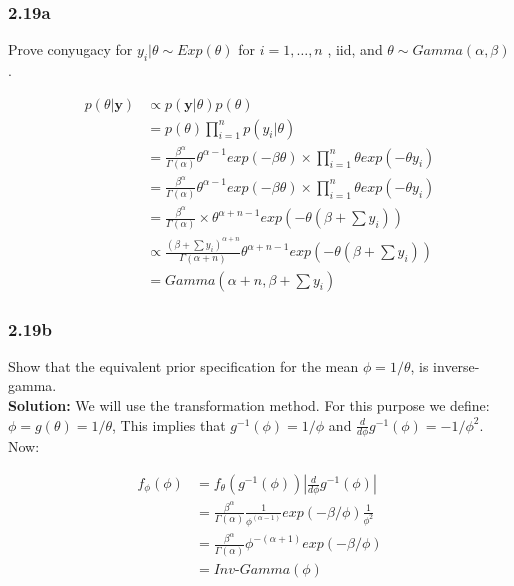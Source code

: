 \documentclass[]{article}
\begin{document}
\subsubsection{2.19a}\label{a-2}

Prove conyugacy for \(y_{i}|\theta \sim Exp(\theta)\) for
\(i= 1, \dots ,n\) , iid, and \(\theta \sim Gamma(\alpha, \beta)\).

\[
\begin{aligned}
p(\theta| \mathbf{y}) &\propto p(\mathbf{y}|\theta)p(\theta) \\
&= p(\theta) \prod_{i=1}^{n} p(y_{i}|\theta) \\
&= \frac{\beta^{\alpha}}{\Gamma(\alpha)} \theta^{\alpha - 1} exp(-\beta \theta) \times \prod_{i=1}^{n} \theta exp(-\theta y_{i}) \\
&= \frac{\beta^{\alpha}}{\Gamma(\alpha)} \theta^{\alpha - 1} exp(-\beta \theta) \times \prod_{i=1}^{n} \theta exp(-\theta y_{i}) \\
&= \frac{\beta^{\alpha}}{\Gamma(\alpha)}  \times  \theta^{\alpha + n - 1} exp(-\theta(\beta + \sum y_{i}) ) \\
&\propto \frac{(\beta + \sum y_{i})^{\alpha + n}}{\Gamma(\alpha + n)} \theta^{\alpha + n - 1} exp(-\theta(\beta + \sum y_{i}) ) \\
&= Gamma(\alpha + n, \beta + \sum y_{i}) 
\end{aligned} 
\]

\subsubsection{2.19b}\label{b-1}

Show that the equivalent prior specification for the mean
\(\phi = 1/\theta\), is inverse-gamma.\\
\textbf{Solution:} We will use the transformation method. For this
purpose we define: \(\phi = g(\theta) = 1/\theta\), This implies that
\(g^{-1}(\phi) = 1/\phi\) and
\(\frac{d}{d\phi} g^{-1}(\phi) = - 1/\phi^{2}\). Now:

\[
\begin{aligned}
f_{\phi}(\phi) &= f_{\theta}\left( g^{-1}(\phi) \right) |\frac{d}{d\phi}g^{-1}(\phi)|\\
&= \frac{\beta^{\alpha}}{\Gamma(\alpha)} \frac{1}{\phi^{(\alpha - 1)}}  exp(-\beta/\phi) \frac{1}{\phi^2} \\
&= \frac{\beta^{\alpha}}{\Gamma(\alpha)} \phi^{- (\alpha + 1)}  exp(-\beta/\phi) \\
&= Inv\text{-}Gamma(\phi)
\end{aligned}
\]
\end{document}
